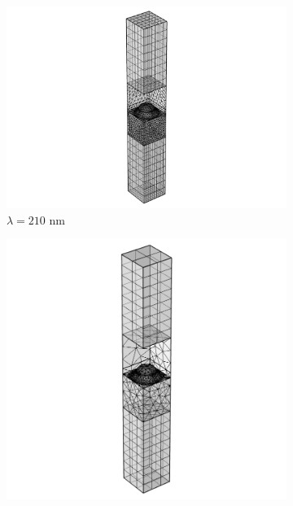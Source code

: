 \begin{figure}[htb]
    \begin{subfigure}{.2\textwidth}
        \centering %
        \includegraphics[scale=0.4, trim=12cm 0cm 12cm 0cm, clip]{figures/ch4/Mesh_210nm_hair=hsub=ax_PMLheight=033wl_max_wl_max=1600_current.png}
        \caption{$\lambda=210$ nm}
        \label{fig:meshDomainHeight_c}
    \end{subfigure}
    \begin{subfigure}{.2\textwidth}
        \centering %
        \includegraphics[scale=0.4, trim=8cm 0cm 8cm 0cm, clip]{figures/ch4/Mesh_800nm_hair=hsub=ax_PMLheight=033wl_max_wl_max=1600_current.png}

\end{subfigure}
\end{figure}
